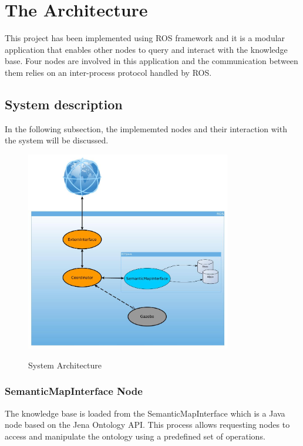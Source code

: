 \section{The Architecture}

This project has been implemented using ROS framework and it is a modular application that enables other nodes to query and interact with the knowledge base. Four nodes are involved in this application and the communication between them relies on an inter-process protocol handled by ROS.

\subsection{System description}

In the following subsection, the implememted nodes and their interaction with the system will be discussed. 

\begin{figure}[H]
\centering
\includegraphics[width=0.8\textwidth]{imgs/architecture.jpg}
\label{fig:actions}
\caption{System Architecture}
\end{figure}

\subsubsection{SemanticMapInterface Node}
The knowledge base is loaded from the SemanticMapInterface which is a Java node based on the Jena Ontology API. This process allows requesting nodes to access and manipulate the ontology using a predefined set of operations.

